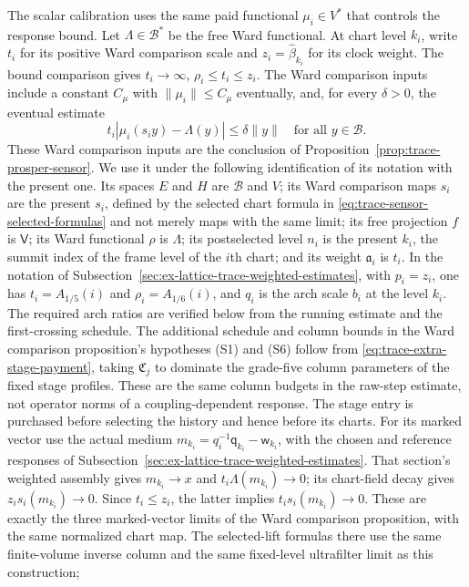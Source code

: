 The scalar calibration uses the same paid functional $\mu_i\in V^*$ that controls
the response bound. Let $\Lambda\in\mathcal B^*$ be the free Ward functional.
At chart level $k_i$, write $t_i$ for its positive Ward comparison
scale and $z_i=\widehat\beta_{k_i}$ for its clock weight. The bound comparison
gives $t_i\to\infty$, $\rho_i\le t_i\le z_i$. The Ward comparison inputs
include a constant $C_\mu$ with $\|\mu_i\|\le C_\mu$ eventually, and, for
every $\delta>0$, the eventual estimate
\[
 t_i\left|\mu_i(s_i y)-\Lambda(y)\right|
       \le\delta\|y\|\quad\text{for all }y\in\mathcal B.
\]
These Ward comparison inputs are the conclusion of
Proposition~\ref{prop:trace-prosper-sensor}. We use it under the
following identification of its notation with the present one. Its spaces $E$ and $H$ are $\mathcal B$ and $V$; its Ward comparison
maps $s_i$ are the present $s_i$, defined by the selected chart formula
in \eqref{eq:trace-sensor-selected-formulas} and not
merely maps with the
same limit; its free projection $f$ is $\mathsf V$; its Ward functional
$\rho$ is $\Lambda$; its postselected level $n_i$ is the present $k_i$,
the summit index of the frame level of the $i$th chart; and its weight
$\mathfrak a_i$ is $t_i$. In the notation of
Subsection~\ref{sec:ex-lattice-trace-weighted-estimates}, with $p_i=z_i$,
one has $t_i=A_{1/5}(i)$ and $\rho_i=A_{1/6}(i)$, and $q_i$ is the arch
scale $b_i$ at the level $k_i$. The required arch ratios are verified
below from the running estimate and the first-crossing schedule. The
additional schedule and column bounds in the Ward comparison proposition's hypotheses (S1) and (S6)
follow from \eqref{eq:trace-extra-stage-payment}, taking $\mathfrak C_j$ to
dominate the grade-five column parameters of the fixed stage profiles.
These are the same column budgets in the raw-step estimate, not
operator norms of a coupling-dependent response. The stage entry is
purchased before selecting the history and hence before its charts. For its
marked vector use the actual medium
$m_{k_i}=q_i^{-1}\mathsf q_{k_i}-\mathsf w_{k_i}$, with the chosen
and reference responses of
Subsection~\ref{sec:ex-lattice-trace-weighted-estimates}. That section's
weighted assembly gives $m_{k_i}\to x$ and
$t_i\Lambda(m_{k_i})\to0$; its chart-field decay gives
$z_i s_i(m_{k_i})\to0$. Since $t_i\le z_i$, the latter implies
$t_i s_i(m_{k_i})\to0$. These are exactly the three marked-vector
limits of the Ward comparison proposition, with the same normalized chart map.
The selected-lift formulas there use the same finite-volume inverse
column and the same fixed-level ultrafilter limit as this construction;
